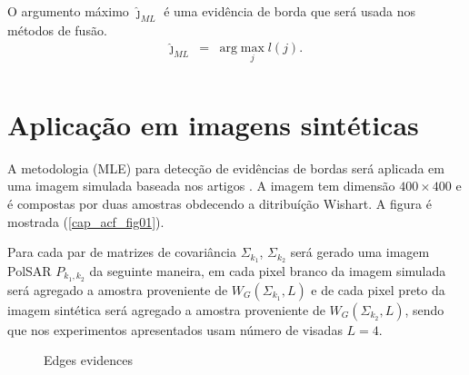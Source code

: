 \documentclass[conference]{IEEEtran}
\begin{document}
O argumento máximo  $\widehat{\jmath}_{ML}$ é uma evidência de borda que será usada nos métodos de fusão.
\begin{equation*}
\begin{array}{rcl}
	\widehat{\jmath}_{ML}&=&\text{arg}\max\limits_{j}l(j).  \\
\end{array}
\end{equation*}

\section{Aplicação em imagens sintéticas}\label{cap_acf_sec4}

A metodologia (MLE) para detecção de evidências de bordas será aplicada em uma imagem simulada baseada nos artigos \cite{nhfc,gamf}. A imagem tem dimensão $400\times400$  e é compostas por duas amostras obdecendo a ditribuíção Wishart. A figura é mostrada  (\ref{cap_acf_fig01}).

Para cada par de matrizes de covariância $\Sigma_{k_1}$, $\Sigma_{k_2}$ será gerado uma imagem PolSAR $P_{k_1,k_2}$ da seguinte maneira, em cada pixel branco da imagem simulada será agregado a amostra proveniente de $W_G(\Sigma_{k_1}, L)$ e de cada pixel preto da imagem sintética será agregado a amostra proveniente de $W_G(\Sigma_{k_2},L)$, sendo que nos experimentos apresentados usam número de visadas $L=4$.
 \begin{figure}[!ht]
     \hfill
    \caption{Edges evidences}
     \label{fig_01}
   \end{figure}
\end{document}
